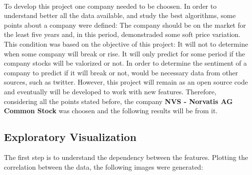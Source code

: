 \ \\
To develop this project one company needed to be choosen. In order to understand better all the data available, and study the best algorithms, some points about a company were defined: The
company should be on the market for the least five years and, in this period, demonstraded some soft price variation.
This condition was based on the objective of this project: It will not to determine when some company will break or rise. It will only predict for some period if the company stocks will
be valorized or not. In order to determine the sentiment of a company to predict if it will break or not, would be necessary data from other sources, such as twitter.
However, this project will remain as an open source code and eventually will be developed to work with new features. 
Therefore, considering all the points stated before, the company \textbf{NVS - Norvatis AG Common Stock}  was choosen and the following results will be from it.\\


\subsection{Exploratory Visualization}
\label{subsec:Exploratory_visu}
The first step is to understand the dependency between the features. Plotting the correlation between the data, the following images were generated:\\

